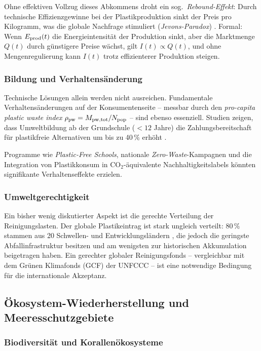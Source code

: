 ﻿\documentclass[12pt,a4paper]{article}
\theoremstyle{definition}
\theoremstyle{remark}
\begin{document}
Ohne effektiven Vollzug dieses Abkommens droht ein sog.\
\textit{Rebound-Effekt}: Durch technische Effizienzgewinne bei der
Plastikproduktion sinkt der Preis pro Kilogramm, was die globale
Nachfrage stimuliert (\textit{Jevons-Paradox}) \cite{jevons1865coal}.
Formal: Wenn $E_{\rm prod}(t)$ die Energieintensit\"at der Produktion
sinkt, aber die Marktmenge $Q(t)$ durch g\"unstigere Preise w\"achst,
gilt $I(t) \propto Q(t)$, und ohne Mengenregulierung kann $I(t)$ trotz
effizienterer Produktion steigen.

\subsubsection{Bildung und Verhaltens\"anderung}

Technische L\"osungen allein werden nicht ausreichen. Fundamentale
Verhaltens\"anderungen auf der Konsumentenseite -- messbar durch den
\textit{pro-capita plastic waste index} $\rho_{\rm pw} = M_{\rm pw,tot} / N_{\rm pop}$
-- sind ebenso essenziell. Studien zeigen, dass Umweltbildung ab der
Grundschule ($<12$ Jahre) die Zahlungsbereitschaft f\"ur plastikfreie
Alternativen um bis zu 40\,\% erh\"oht \cite{hart2019environmental}.

Programme wie \textit{Plastic-Free Schools}, nationale \textit{Zero-Waste}-Kampagnen
und die Integration von Plastikkonsum in CO$_2$-\"aquivalente
Nachhaltigkeitslabels k\"onnten signifikante Verhaltenseffekte erzielen.

\subsubsection{Umweltgerechtigkeit}

Ein bisher wenig diskutierter Aspekt ist die gerechte Verteilung
der Reinigungslasten. Der globale Plastikeintrag ist stark ungleich verteilt:
$80\,\%$ stammen aus 20 Schwellen- und Entwicklungsländern \cite{jambeck2015plastic},
die jedoch die geringste Abfallinfrastruktur besitzen und am wenigsten
zur historischen Akkumulation beigetragen haben. Ein gerechter globaler
Reinigungsfonds -- vergleichbar mit dem Grünen Klimafonds (GCF) der UNFCCC --
ist eine notwendige Bedingung f\"ur die internationale Akzeptanz.

\subsection{\"Okosystem-Wiederherstellung und Meeresschutzgebiete}

\subsubsection{Biodiversit\"at und Korallen\"okosysteme}
\end{document}
